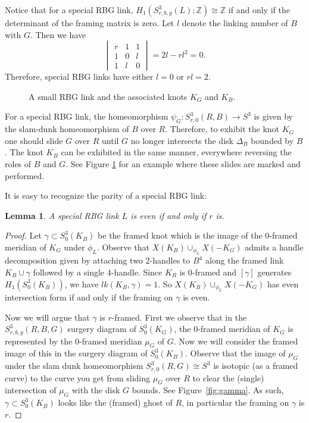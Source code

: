 \documentclass [11pt]{amsart}
\newtheorem {lemma}[theorem]{Lemma}
\theoremstyle{remark}
\def\Z {{\mathbb{Z}}}
\begin{document}
Notice that for a special RBG link, $H_1(S^3_{r, b, g}(L); \Z) \cong \Z$ if and only if the determinant of the framing matrix is zero. Let $l$ denote the linking number of $B$ with $G$. Then we have
\[
\begin{vmatrix}
r & 1 & 1 \\
1 & 0 & l \\
1 & l & 0
\end{vmatrix} = 2l - rl^2 = 0.
\]
Therefore, special RBG links have either $l=0$ or $rl = 2$.
\begin{figure}
{
   \fontsize{9pt}{11pt}\selectfont
   \def\svgwidth{3.8in}
   
}
\caption{A small RBG link and the associated knots $K_G$ and $K_B$.}
\label{fig:smallRBG}
\end{figure}

For a special RBG link, the homeomorphism $\psi_G:S^3_{r,0}(R,B)\to S^3$ is given by the slam-dunk homeomorphism of $B$ over $R$. 
Therefore, to exhibit the knot $K_G$  one should slide $G$ over $R$ until $G$ no longer intersects the disk $\Delta_B$ bounded by $B$. The knot $K_B$ can be exhibited in the same manner, everywhere reversing the roles of $B$ and $G$. See Figure \ref{fig:smallRBG} for an example where these slides are marked and performed. 




It is easy to recognize the parity of a special RBG link:

\begin{lemma}
\label{lem:specialeven}
A special RBG link $L$ is even if and only if $r$ is. 
\end{lemma}
\begin{proof}
Let $\gamma\subset S^3_0(K_B)$ be the framed knot which is the image of the 0-framed meridian of $K_G$ under $\phi_L$. Observe that $X(K_B)\cup_{\phi_L}X(-K_G)$ admits a handle decomposition given by attaching two 2-handles to $B^4$ along the framed link $K_B \cup \gamma$ followed by a single 4-handle. Since $K_B$ is 0-framed and $[\gamma]$ generates $H_1(S^3_0(K_B))$, we have $lk(K_B,\gamma)=1$. So $X(K_B)\cup_{\phi_L}X(-K_G)$ has even intersection form if and only if the framing on $\gamma$ is even. 

Now we will argue that $\gamma$ is $r$-framed. First we observe that in the $S^3_{r,b,g}(R,B,G)$ surgery diagram of $S^3_0(K_G)$, the 0-framed meridian of $K_G$ is represented by the 0-framed meridian $\mu_G$ of $G$. Now we will consider the framed image of this in the surgery diagram of $S^3_0(K_B)$. Observe that the image of $\mu_G$ under the slam dunk homeomorphism $S^3_{r,0}(R,G)\cong S^3$ is isotopic (as a framed curve) to the curve you get from sliding $\mu_G$ over $R$ to clear the (single) intersection of $\mu_G$ with the disk $G$ bounds. See Figure~\ref{fig:gamma}. As such, $\gamma\subset S^3_0(K_B)$ looks like the (framed) ghost of $R$, in particular the framing on $\gamma$ is $r$. 
\end{proof}
\end{document}
